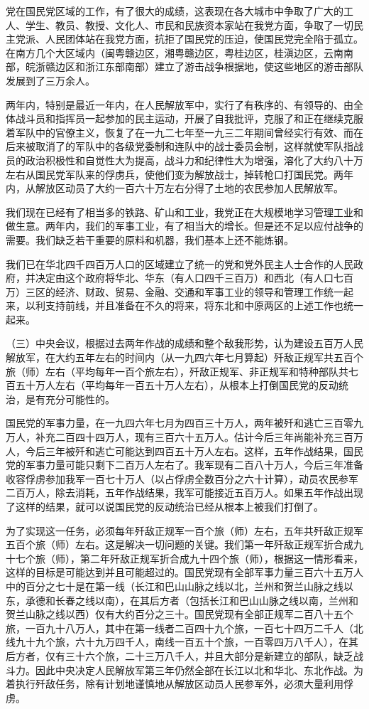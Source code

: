 党在国民党区域的工作，有了很大的成绩，这表现在各大城市中争取了广大的工人、学生、教员、教授、文化人、市民和民族资本家站在我党方面，争取了一切民主党派、人民团体站在我党方面，抗拒了国民党的压迫，使国民党完全陷于孤立。在南方几个大区域内（闽粤赣边区，湘粤赣边区，粤桂边区，桂滇边区，云南南部，皖浙赣边区和浙江东部南部）建立了游击战争根据地，使这些地区的游击部队发展到了三万余人。

两年内，特别是最近一年内，在人民解放军中，实行了有秩序的、有领导的、由全体战斗员和指挥员一起参加的民主运动，开展了自我批评，克服了和正在继续克服着军队中的官僚主义，恢复了在一九二七年至一九三二年期间曾经实行有效、而在后来被取消了的军队中的各级党委制和连队中的战士委员会制，这样就使军队指战员的政治积极性和自觉性大为提高，战斗力和纪律性大为增强，溶化了大约八十万左右从国民党军队来的俘虏兵，使他们变为解放战士，掉转枪口打国民党。两年内，从解放区动员了大约一百六十万左右分得了土地的农民参加人民解放军。

我们现在已经有了相当多的铁路、矿山和工业，我党正在大规模地学习管理工业和做生意。两年内，我们的军事工业，有了相当大的增长。但是还不足以应付战争的需要。我们缺乏若干重要的原料和机器，我们基本上还不能炼钢。

我们已在华北四千四百万人口的区域建立了统一的党和党外民主人士合作的人民政府，并决定由这个政府将华北、华东（有人口四千三百万）和西北（有人口七百万）三区的经济、财政、贸易、金融、交通和军事工业的领导和管理工作统一起来，以利支持前线，并且准备在不久的将来，将东北和中原两区的上述工作也统一起来。

（三）中央会议，根据过去两年作战的成绩和整个敌我形势，认为建设五百万人民解放军，在大约五年左右的时间内（从一九四六年七月算起）歼敌正规军共五百个旅（师）左右（平均每年一百个旅左右），歼敌正规军、非正规军和特种部队共七百五十万人左右（平均每年一百五十万人左右），从根本上打倒国民党的反动统治，是有充分可能性的。

国民党的军事力量，在一九四六年七月为四百三十万人，两年被歼和逃亡三百零九万人，补充二百四十四万人，现有三百六十五万人。估计今后三年尚能补充三百万人，今后三年被歼和逃亡可能达到四百五十万人左右。这样，五年作战结果，国民党的军事力量可能只剩下二百万人左右了。我军现有二百八十万人，今后三年准备收容俘虏参加我军一百七十万人（以占俘虏全数百分之六十计算），动员农民参军二百万人，除去消耗，五年作战结果，我军可能接近五百万人。如果五年作战出现了这样的结果，就可以说国民党的反动统治已经从根本上被我们打倒了。

为了实现这一任务，必须每年歼敌正规军一百个旅（师）左右，五年共歼敌正规军五百个旅（师）左右。这是解决一切问题的关键。我们第一年歼敌正规军折合成九十七个旅（师），第二年歼敌正规军折合成九十四个旅（师），根据这一情形看来，这样的目标是可能达到并且可能超过的。国民党现有全部军事力量三百六十五万人中的百分之七十是在第一线（长江和巴山山脉之线以北，兰州和贺兰山脉之线以东，承德和长春之线以南），在其后方者（包括长江和巴山山脉之线以南，兰州和贺兰山脉之线以西）仅有大约百分之三十。国民党现有全部正规军二百八十五个旅，一百九十八万人，其中在第一线者二百四十九个旅，一百七十四万二千人（北线九十九个旅，六十九万四千人，南线一百五十个旅，一百零四万八千人），在其后方者，仅有三十六个旅，二十三万八千人，并且大部分是新建立的部队，缺乏战斗力。因此中央决定人民解放军第三年仍然全部在长江以北和华北、东北作战。为着执行歼敌任务，除有计划地谨慎地从解放区动员人民参军外，必须大量利用俘虏。

